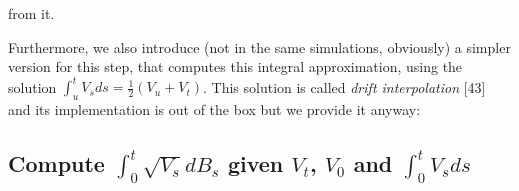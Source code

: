 \documentclass[12pt,twoside]{reedthesis}
\theoremstyle{definition}
\theoremstyle{definition}
\theoremstyle{remark}
\begin{document}
  from it.
  \begin{Shaded}
  \begin{Highlighting}[]
  \StringTok{ }\OperatorTok{-}
  \StringTok{ }
  \StringTok{ }
  \StringTok{ }\OperatorTok{-}\StringTok{ }
      \OperatorTok{==}\StringTok{ }\OperatorTok{-}\NormalTok{)}
  \StringTok{ }\OperatorTok{-}\NormalTok{)}
      \OperatorTok{==}\StringTok{ }\NormalTok{)}
  \StringTok{ }
      \NormalTok{(}
                      \NormalTok{)}\OperatorTok{$}
  \NormalTok{  \}}
  \StringTok{ }\OperatorTok{::}
  \end{Highlighting}
  \end{Shaded}
  \normalsize
  
  Furthermore, we also introduce (not in the same simulations, obviously)
  a simpler version for this step, that computes this integral
  approximation, using the solution
  \(\int_{u}^{t}{V_s ds} = \frac{1}{2} \left( V_u + V_t \right)\). This
  solution is called \emph{drift interpolation} {[}43{]} and its
  implementation is out of the box but we provide it anyway:
  \begin{Shaded}
  \begin{Highlighting}[]
  \StringTok{ }\OperatorTok{*}\StringTok{ }\NormalTok{((}\OperatorTok{/}\NormalTok{) }\OperatorTok{*}\StringTok{ }\OperatorTok{+}\StringTok{ }\NormalTok{(}\OperatorTok{/}\NormalTok{) }\OperatorTok{*}\StringTok{ }
  \end{Highlighting}
  \end{Shaded}
  \subsection{\texorpdfstring{Compute \(\int_0^t \sqrt{V_s}dB_s\) given
  \(V_t\), \(V_0\) and
  \(\int_0^t V_sds\)}{Compute \textbackslash{}int\_0\^{}t \textbackslash{}sqrt\{V\_s\}dB\_s given V\_t, V\_0 and \textbackslash{}int\_0\^{}t V\_sds}}\label{compute-int_0t-sqrtv_sdb_s-given-v_t-v_0-and-int_0t-v_sds}
  
\end{document}
